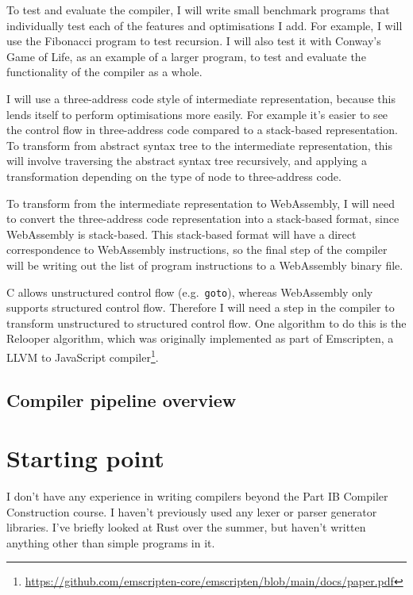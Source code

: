 \documentclass[12pt,a4paper]{article}
\begin{document}
To test and evaluate the compiler, I will write small benchmark programs that individually test each of the features and optimisations I add. For example, I will use the Fibonacci program to test recursion.
I will also test it with Conway's Game of Life, as an example of a larger program, to test and evaluate the functionality of the compiler as a whole.


I will use a three-address code style of intermediate representation, because this lends itself to perform optimisations more easily. For example it's easier to see the control flow in three-address code compared to a stack-based representation.
To transform from abstract syntax tree to the intermediate representation, this will involve traversing the abstract syntax tree recursively, and applying a transformation depending on the type of node to three-address code.



To transform from the intermediate representation to WebAssembly, I will need to convert the three-address code representation into a stack-based format, since WebAssembly is stack-based. This stack-based format will have a direct correspondence to WebAssembly instructions, so the final step of the compiler will be writing out the list of program instructions to a WebAssembly binary file.

C allows unstructured control flow (e.g.\ \texttt{goto}), whereas WebAssembly only supports structured control flow. Therefore I will need a step in the compiler to transform unstructured to structured control flow. One algorithm to do this is the Relooper algorithm, which was originally implemented as part of Emscripten, a LLVM to JavaScript compiler\footnote{\url{https://github.com/emscripten-core/emscripten/blob/main/docs/paper.pdf}}.

\subsection*{Compiler pipeline overview}




\section*{Starting point}

I don't have any experience in writing compilers beyond the Part IB Compiler Construction course. I haven't previously used any lexer or parser generator libraries.
I've briefly looked at Rust over the summer, but haven't written anything other than simple programs in it.
\end{document}
